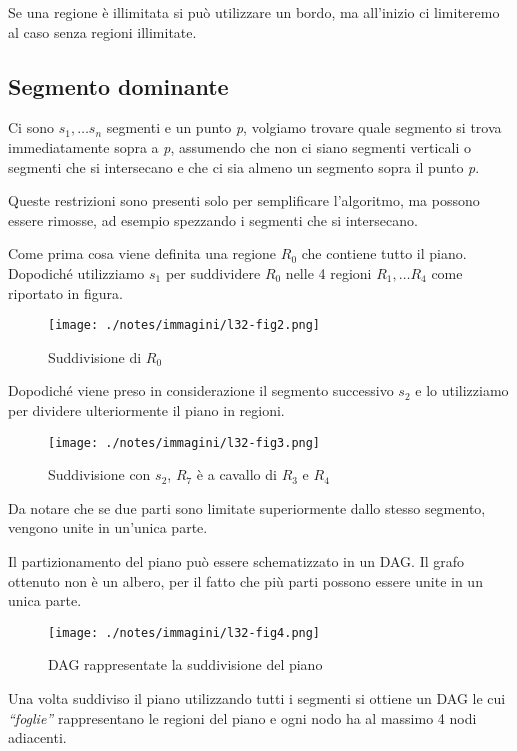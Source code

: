 Se una regione è illimitata si può utilizzare un bordo, ma all'inizio ci limiteremo al caso senza regioni illimitate.

\subsection{Segmento dominante}\label{segmento-dominante}

Ci sono $s_1,  \ldots s_n$ segmenti e un punto \emph{p}, volgiamo trovare quale segmento si trova immediatamente sopra a \emph{p}, assumendo che non ci siano segmenti verticali o segmenti che si intersecano e che ci sia almeno un segmento sopra il punto \emph{p}.

Queste restrizioni sono presenti solo per semplificare l'algoritmo, ma possono essere rimosse, ad esempio spezzando i segmenti che si intersecano.

Come prima cosa viene definita una regione $R_0$ che contiene tutto il piano. Dopodiché utilizziamo $s_1$ per suddividere $R_0$ nelle 4 regioni $R_1, \ldots R_4$ come riportato in figura.

\begin{figure}[htbp]
\centering
\texttt{[image: ./notes/immagini/l32-fig2.png]}
\caption{Suddivisione di $R_0$}
\end{figure}
\FloatBarrier

Dopodiché viene preso in considerazione il segmento successivo $s_2$ e lo utilizziamo per dividere ulteriormente il piano in regioni.

\begin{figure}[htbp]
\centering
\texttt{[image: ./notes/immagini/l32-fig3.png]}
\caption{Suddivisione con $s_2$, $R_7$ è a cavallo di $R_3$ e $R_4$}
\end{figure}

Da notare che se due parti sono limitate superiormente dallo stesso segmento, vengono unite in un'unica parte.

Il partizionamento del piano può essere schematizzato in un DAG. 
Il grafo ottenuto non è un albero, per il fatto che più parti possono essere unite in un unica parte.

\begin{figure}[htbp]
\centering
\texttt{[image: ./notes/immagini/l32-fig4.png]}
\caption{DAG rappresentate la suddivisione del piano}
\end{figure}

Una volta suddiviso il piano utilizzando tutti i segmenti si ottiene un DAG le cui \emph{``foglie''} rappresentano le regioni del piano e ogni nodo ha al massimo 4 nodi adiacenti.

